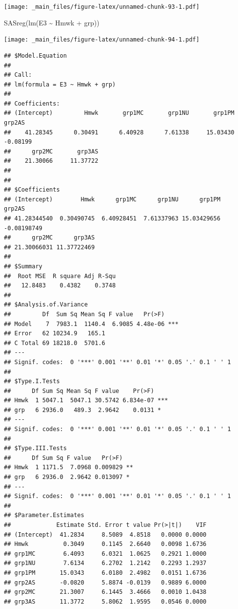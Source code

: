 \documentclass[
]{book}
\newenvironment{Shaded}{\begin{snugshade}}{\end{snugshade}}
\newcommand{\FunctionTok}[1]{\textcolor[rgb]{0.00,0.00,0.00}{#1}}
\newcommand{\NormalTok}[1]{#1}
\newcommand{\SpecialCharTok}[1]{\textcolor[rgb]{0.00,0.00,0.00}{#1}}
\begin{document}
\texttt{[image: \_main\_files/figure-latex/unnamed-chunk-93-1.pdf]}

\begin{Shaded}
\begin{Highlighting}[]
\FunctionTok{SASreg}\NormalTok{(}\FunctionTok{lm}\NormalTok{(E3 }\SpecialCharTok{\textasciitilde{}}\NormalTok{ Hmwk }\SpecialCharTok{+}\NormalTok{ grp))}
\end{Highlighting}
\end{Shaded}

\texttt{[image: \_main\_files/figure-latex/unnamed-chunk-94-1.pdf]}

\begin{verbatim}
## $Model.Equation
## 
## Call:
## lm(formula = E3 ~ Hmwk + grp)
## 
## Coefficients:
## (Intercept)         Hmwk       grp1MC       grp1NU       grp1PM       grp2AS  
##    41.28345      0.30491      6.40928      7.61338     15.03430     -0.08199  
##      grp2MC       grp3AS  
##    21.30066     11.37722  
## 
## 
## $Coefficients
## (Intercept)        Hmwk      grp1MC      grp1NU      grp1PM      grp2AS 
## 41.28344540  0.30490745  6.40928451  7.61337963 15.03429656 -0.08198749 
##      grp2MC      grp3AS 
## 21.30066031 11.37722469 
## 
## $Summary
##  Root MSE  R square Adj R-Squ 
##   12.8483    0.4382    0.3748 
## 
## $Analysis.of.Variance
##         Df  Sum Sq Mean Sq F value   Pr(>F)    
## Model    7  7983.1  1140.4  6.9085 4.48e-06 ***
## Error   62 10234.9   165.1                     
## C Total 69 18218.0  5701.6                     
## ---
## Signif. codes:  0 '***' 0.001 '**' 0.01 '*' 0.05 '.' 0.1 ' ' 1
## 
## $Type.I.Tests
##      Df Sum Sq Mean Sq F value    Pr(>F)    
## Hmwk  1 5047.1  5047.1 30.5742 6.834e-07 ***
## grp   6 2936.0   489.3  2.9642    0.0131 *  
## ---
## Signif. codes:  0 '***' 0.001 '**' 0.01 '*' 0.05 '.' 0.1 ' ' 1
## 
## $Type.III.Tests
##      Df Sum Sq F value   Pr(>F)   
## Hmwk  1 1171.5  7.0968 0.009829 **
## grp   6 2936.0  2.9642 0.013097 * 
## ---
## Signif. codes:  0 '***' 0.001 '**' 0.01 '*' 0.05 '.' 0.1 ' ' 1
## 
## $Parameter.Estimates
##             Estimate Std. Error t value Pr(>|t|)    VIF
## (Intercept)  41.2834     8.5089  4.8518   0.0000 0.0000
## Hmwk          0.3049     0.1145  2.6640   0.0098 1.6736
## grp1MC        6.4093     6.0321  1.0625   0.2921 1.0000
## grp1NU        7.6134     6.2702  1.2142   0.2293 1.2937
## grp1PM       15.0343     6.0180  2.4982   0.0151 1.6736
## grp2AS       -0.0820     5.8874 -0.0139   0.9889 6.0000
## grp2MC       21.3007     6.1445  3.4666   0.0010 1.0438
## grp3AS       11.3772     5.8062  1.9595   0.0546 0.0000
\end{verbatim}
\end{document}
